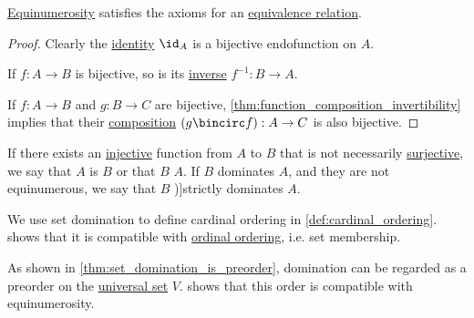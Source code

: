 \begin{proposition}\label{thm:equinumerosity_is_equivalence}
  \hyperref[def:equinumerosity]{Equinumerosity} satisfies the axioms for an \hyperref[def:equivalence_relation]{equivalence relation}.
\end{proposition}
\begin{proof}
   Clearly the \hyperref[def:set_valued_function/identity]{identity} \( \id_A \) is a bijective endofunction on \( A \).

   If \( f: A \to B \) is bijective, so is its \hyperref[def:set_valued_function/inverse]{inverse} \( f^{-1}: B \to A \).

   If \( f: A \to B \) and \( g: B \to C \) are bijective, \cref{thm:function_composition_invertibility} implies that their \hyperref[def:set_valued_function/composition]{composition} \( (g \bincirc f): A \to C \) is also bijective.
\end{proof}

\begin{definition}\label{def:set_domination}
  If there exists an \hyperref[def:function_invertibility/injective]{injective} function from \( A \) to \( B \) that is not necessarily \hyperref[def:function_invertibility/surjective]{surjective}, we say that \( A \) is  \( B \) or that \( B \)  \( A \). If \( B \) dominates \( A \), and they are not equinumerous, we say that \( B \) \term[en=strictly dominates (\cite[90]{Halmos1960NaiveSetTheory})]{strictly dominates} \( A \).
\end{definition}
\begin{comments}
  \item We use set domination to define cardinal ordering in \cref{def:cardinal_ordering}.  shows that it is compatible with \hyperref[def:ordinal_ordering]{ordinal ordering}, i.e. set membership.

  \item As shown in \cref{thm:set_domination_is_preorder}, domination can be regarded as a preorder on the \hyperref[def:universal_set]{universal set} \( V \).  shows that this order is compatible with equinumerosity.
\end{comments}

